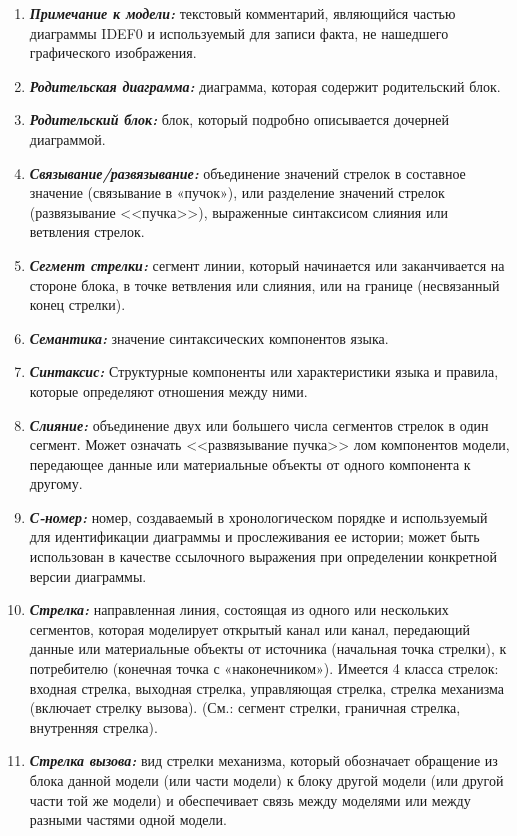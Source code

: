 \documentclass[a4paper, final]{article}
\begin{document}
\begin{enumerate}
  \item \textbf{\textit{Примечание к модели:}} текстовый комментарий, являющийся частью диаграммы IDEF0 и используемый для записи факта, не нашедшего графического изображения.
  \item \textbf{\textit{Родительская диаграмма:}} диаграмма, которая содержит родительский блок.
  \item \textbf{\textit{Родительский блок:}} блок, который подробно описывается дочерней диаграммой.
  \item \textbf{\textit{Связывание/развязывание:}} объединение значений стрелок в составное значение (связывание в «пучок»), или разделение значений стрелок (развязывание <<пучка>>), выраженные синтаксисом слияния или ветвления стрелок.
  \item \textbf{\textit{Сегмент стрелки:}} сегмент линии, который начинается или заканчивается на стороне блока, в точке ветвления или слияния, или на границе (несвязанный конец стрелки).
  \item \textbf{\textit{Семантика:}} значение синтаксических компонентов языка.
  \item \textbf{\textit{Синтаксис:}} Структурные компоненты или характеристики языка и правила, которые определяют отношения между ними.
  \item \textbf{\textit{Слияние:}} объединение двух или большего числа сегментов стрелок в один сегмент. Может означать <<развязывание пучка>>
  лом компонентов модели, передающее данные или материальные объекты от одного компонента к другому.
  \item \textbf{\textit{С-номер:}} номер, создаваемый в хронологическом порядке и используемый для идентификации диаграммы и прослеживания ее истории; может быть использован в качестве ссылочного выражения при определении конкретной версии диаграммы.
  \item \textbf{\textit{Стрелка:}} направленная линия, состоящая из одного или нескольких сегментов, которая моделирует открытый канал или канал, передающий данные или материальные объекты от источника (начальная точка стрелки), к потребителю (конечная точка с «наконечником»). Имеется 4 класса стрелок: входная стрелка, выходная стрелка, управляющая стрелка, стрелка механизма (включает стрелку вызова). (См.: сегмент стрелки, граничная стрелка, внутренняя стрелка).
  \item \textbf{\textit{Стрелка вызова:}} вид стрелки механизма, который обозначает обращение из блока данной модели (или части модели) к блоку другой модели (или другой части той же модели) и обеспечивает связь между моделями или между разными частями одной модели.

\end{enumerate}
\end{document}

